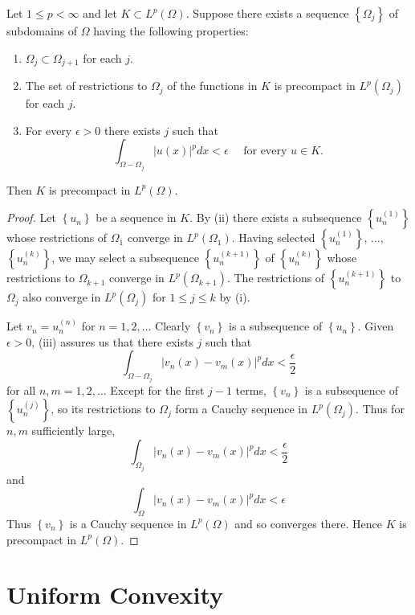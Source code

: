 \begin{theorem}
  Let $1 \leq p<\infty$ and let $K \subset L^p(\Omega)$. Suppose there exists a sequence $\left\{\Omega_j\right\}$ of subdomains of $\Omega$ having the following properties:
  \begin{enumerate}[label = (\roman*)]
    \item $\Omega_j \subset \Omega_{j+1}$ for each $j$.
    \item The set of restrictions to $\Omega_j$ of the functions in $K$ is precompact in $L^p\left(\Omega_j\right)$ for each $j$.
    \item For every $\epsilon>0$ there exists $j$ such that
    \[
    \int_{\Omega-\Omega_j}|u(x)|^p d x<\epsilon \quad \text { for every } u \in K.
    \]
  \end{enumerate}
  Then $K$ is precompact in $L^p(\Omega)$.
\end{theorem}

\begin{proof}
  Let $\left\{u_n\right\}$ be a sequence in $K$.
  By (ii) there exists a subsequence $\left\{u_n^{(1)}\right\}$ whose restrictions
  of $\Omega_1$ converge in $L^p\left(\Omega_1\right)$.
  Having selected $\left\{u_n^{(1)}\right\}$, $\ldots$, $\left\{u_n^{(k)}\right\}$,
  we may select a subsequence $\left\{u_n^{(k+1)}\right\}$ of $\left\{u_n^{(k)}\right\}$
  whose restrictions to $\Omega_{k+1}$ converge in $L^p\left(\Omega_{k+1}\right)$.
  The restrictions of $\left\{u_n^{(k+1)}\right\}$ to $\Omega_j$ also converge
  in $L^p\left(\Omega_j\right)$ for $1 \leq j \leq k$ by (i).
  
  Let $v_n=u_n^{(n)}$ for $n=1,2, \ldots$ Clearly $\left\{v_n\right\}$ is a subsequence
  of $\left\{u_n\right\}$. Given $\epsilon>0$, (iii) assures us that there exists $j$ such that
  \[
  \int_{\Omega-\Omega_j}\left|v_n(x)-v_m(x)\right|^p d x<\frac{\epsilon}{2}
  \]
  for all $n, m=1,2, \ldots$ Except for the first $j-1$ terms, $\left\{v_n\right\}$
  is a subsequence of $\left\{u_n^{(j)}\right\}$, so its restrictions to $\Omega_j$
  form a Cauchy sequence in $L^p\left(\Omega_j\right)$. Thus for $n, m$ sufficiently large,
  \[
  \int_{\Omega_j}\left|v_n(x)-v_m(x)\right|^p d x<\frac{\epsilon}{2}
  \]
  and
  \[
  \int_{\Omega}\left|v_n(x)-v_m(x)\right|^p d x<\epsilon
  \]
  Thus $\left\{v_n\right\}$ is a Cauchy sequence in $L^p(\Omega)$ and so converges there.
  Hence $K$ is precompact in $L^p(\Omega)$.
\end{proof}


\section{Uniform Convexity}

